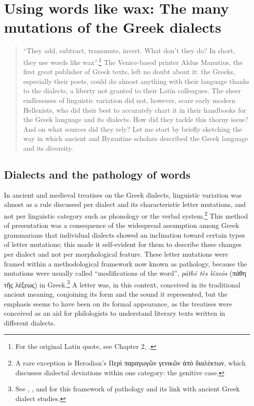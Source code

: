 \chapter{Using words like wax: The many mutations of the Greek dialects}\label{chap:6}
\begin{quote}
“They add, subtract, transmute, invert. What don’t they do? In short, they use words like wax”.\footnote{{For the original Latin quote, see Chapter 2, .}} The Venice-based printer Aldus Manutius, the first great publisher of Greek texts, left no doubt about it: the Greeks, especially their poets, could do almost anything with their language thanks to the dialects, a liberty not granted to their Latin colleagues. The sheer endlessness of linguistic variation did not, however, scare early modern Hellenists, who did their best to accurately chart it in their handbooks for the Greek language and its dialects. How did they tackle this thorny issue? And on what sources did they rely? Let me start by briefly sketching the way in which ancient and Byzantine scholars described the Greek language and its diversity.
\end{quote}

\section{Dialects and the pathology of words}\label{sec:6.1}

In ancient and medieval treatises on the Greek dialects, linguistic variation was almost as a rule discussed per dialect and its characteristic letter mutations, and not per linguistic category such as phonology or the verbal system.\footnote{{A rare exception is Herodian’s Περὶ παραγωγῶν γενικῶν ἀπὸ διαλέκτων, which discusses dialectal deviations within one category: the genitive case.}} This method of presentation was a consequence of the widespread assumption among Greek grammarians that individual dialects showed an inclination toward certain types of letter mutations; this made it self-evident for them to describe these changes per dialect and not per morphological feature. These letter mutations were framed within a methodological framework now known as pathology, because the mutations were usually called “modifications of the word”, \textit{páthē tês léxeōs} (πάθη τῆς λέξεως) in Greek.\footnote{{See \citet{Wackernagel1876}, \citet[150]{Siebenborn1976}, and \citet[esp. 118]{Lallot1995} for this framework of pathology and its link with ancient Greek dialect studies.}} A letter was, in this context, conceived in its traditional ancient meaning, conjoining its form and the sound it represented, but the emphasis seems to have been on its formal appearance, as the treatises were conceived as an aid for philologists to understand literary texts written in different dialects.




